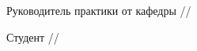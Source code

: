 

\noindent Руководитель практики от кафедры \hfill \ulinetext[2cm]{}{}//

\vspace{0.3cm}

\noindent Студент \hfill \ulinetext[2cm]{}{}//

\vfill

